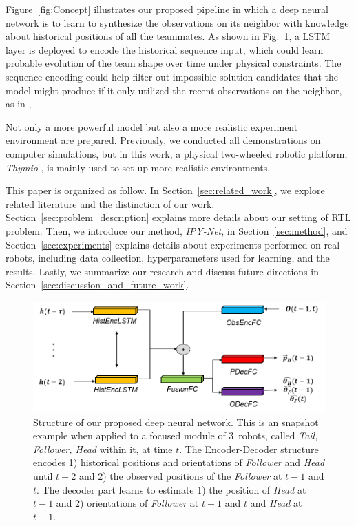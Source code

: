 \documentclass[letterpaper, 10 pt, conference]{ieeeconf}  %
\begin{document}
	Figure~\ref{fig:Concept} illustrates our proposed pipeline in which
	a deep neural network is to learn to synthesize the observations on its neighbor
	with knowledge about historical positions of all the teammates.
	As shown in Fig.~\ref{fig:DL_Pipeline}, a LSTM layer is deployed to encode
	the historical sequence input, which could learn probable evolution of the
	team shape over time under physical constraints.
	The sequence encoding could help filter out impossible solution candidates
	that the model might produce if it only utilized the recent observations on
	the neighbor, as in \cite{CPR17},

	Not only a more powerful model but also a more realistic experiment
	environment are prepared. Previously, we
	conducted all demonstrations on computer simulations, but in this work,
	a physical two-wheeled robotic platform, \emph{Thymio} \cite{Shin14}, is mainly
	used to set up more realistic environments.


	This paper is organized as follow.
	In Section~\ref{sec:related_work}, we explore related literature and the distinction of our work.
	Section~\ref{sec:problem_description} explains more details about our setting of RTL problem.
	Then, we introduce our method, \emph{IPY-Net}, in Section~\ref{sec:method}, and
	Section~\ref{sec:experiments} explains details about experiments performed on real robots,
	including data collection, hyperparameters used for learning, and the results.
	Lastly, we summarize our research and discuss future directions
	in Section~\ref{sec:discussion_and_future_work}.

	\begin{figure}\centering
		\includegraphics[width=1.\columnwidth]{fig_DL_Pipeline}
		\caption{Structure of our proposed deep neural network.
			This is an snapshot example when applied to a focused module of
			$3$~robots, called \emph{Tail, Follower, Head} within it, at time $t$.
			The Encoder-Decoder structure encodes
			1) historical positions and orientations of \emph{Follower} and \emph{Head}
			until $t-2$ and 2) the observed positions of the \emph{Follower} at $t-1$ and $t$.
			The decoder part learns to estimate 1) the position of \emph{Head} at $t-1$ and
			2) orientations of \emph{Follower} at $t-1$ and $t$ and \emph{Head} at $t-1$.
		}
		\label{fig:DL_Pipeline}
	\end{figure}
\end{document}
